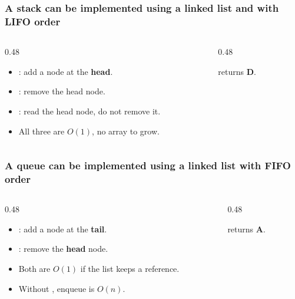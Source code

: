\documentclass[aspectratio=169,10pt,compress]{beamer}
\begin{document}
\begin{frame}[t,fragile] \frametitle{A stack can be implemented using a linked list and with LIFO order}
  \begin{columns}[T]
    \begin{column}{0.48\textwidth}
      \begin{itemize}\small
        \item {}: add a node at the \textbf{head}.
        \item {}: remove the head node.
        \item {}: read the head node, do not remove it.
        \item All three are $O(1)$, no array to grow.
      \end{itemize}
    \end{column}
    \begin{column}{0.48\textwidth}
      \begin{center}
      \end{center}
      \small {} returns \textbf{D}.
    \end{column}
  \end{columns}
\end{frame}




\begin{frame}[t,fragile] \frametitle{A queue can be implemented using a linked list with FIFO order}
  \begin{columns}[T]
    \begin{column}{0.48\textwidth}
      \begin{itemize}\small
        \item {}: add a node at the \textbf{tail}.
        \item {}: remove the \textbf{head} node.
        \item Both are $O(1)$ if the list keeps a  reference.
        \item Without , enqueue is $O(n)$.
      \end{itemize}
    \end{column}
    \begin{column}{0.48\textwidth}
      \begin{center}
      \end{center}
      \small {} returns \textbf{A}.
    \end{column}
  \end{columns}
\end{frame}
\end{document}
